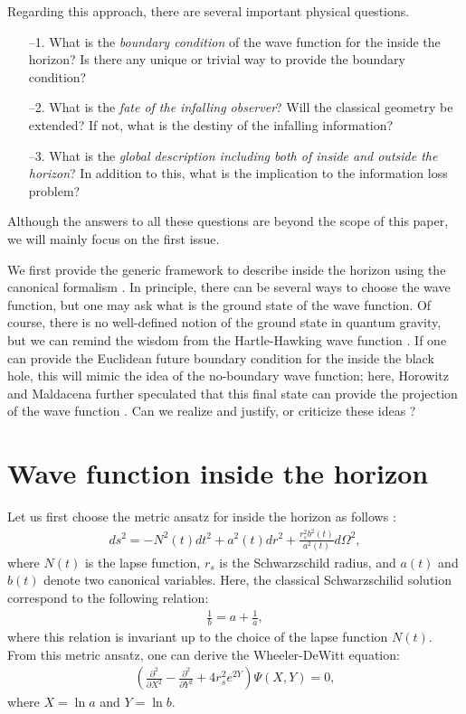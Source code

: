 \documentclass{andromedaone}
\begin{document}
Regarding this approach, there are several important physical questions.
\begin{itemize}
\item[--1.] What is the \textit{boundary condition} of the wave function for the inside the horizon? Is there any unique or trivial way to provide the boundary condition?
\item[--2.] What is the \textit{fate of the infalling observer}? Will the classical geometry be extended? If not, what is the destiny of the infalling information?
\item[--3.] What is the \textit{global description including both of inside and outside the horizon}? In addition to this, what is the implication to the information loss problem?
\end{itemize}
Although the answers to all these questions are beyond the scope of this paper, we will mainly focus on the first issue.

We first provide the generic framework to describe inside the horizon using the canonical formalism \cite{Cavaglia:1994yc}. In principle, there can be several ways to choose the wave function, but one may ask what is the ground state of the wave function. Of course, there is no well-defined notion of the ground state in quantum gravity, but we can remind the wisdom from the Hartle-Hawking wave function \cite{Hartle:1983ai}. If one can provide the Euclidean future boundary condition for the inside the black hole, this will mimic the idea of the no-boundary wave function; here, Horowitz and Maldacena further speculated that this final state can provide the projection of the wave function \cite{Horowitz:2003he}. Can we realize and justify, or criticize these ideas \cite{Yeom:2008nt}?


\section{Wave function inside the horizon}
\label{sec:wav}

Let us first choose the metric ansatz for inside the horizon as follows \cite{Bouhmadi-Lopez:2019kkt}:
\begin{eqnarray}
ds^{2} = - N^{2}(t) dt^{2} + a^{2}(t) dr^{2} + \frac{r_{s}^{2} b^{2}(t)}{a^{2}(t)} d\Omega^{2},
\end{eqnarray}
where $N(t)$ is the lapse function, $r_{s}$ is the Schwarzschild radius, and $a(t)$ and $b(t)$ denote two canonical variables. Here, the classical Schwarzschilid solution correspond to the following relation:
\begin{eqnarray}
\frac{1}{b} = a + \frac{1}{a},
\end{eqnarray}
where this relation is invariant up to the choice of the lapse function $N(t)$. From this metric ansatz, one can derive the Wheeler-DeWitt equation:
\begin{eqnarray}
\left( \frac{\partial^{2}}{\partial X^{2}} - \frac{\partial^{2}}{\partial Y^{2}} + 4 r_{s}^{2} e^{2Y} \right) \Psi \left(X,Y\right) = 0,
\end{eqnarray}
where $X = \ln a$ and $Y = \ln b$.
\end{document}
